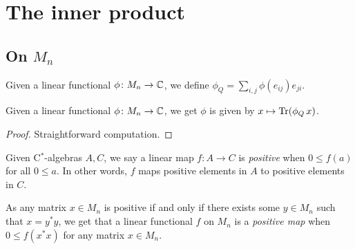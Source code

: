 \chapter{The inner product}

 \section{On $M_n$}

  \begin{definition}\label{Dual.matrix}\leanok
   Given a linear functional $\phi\colon M_n \to \mathbb{C}$, we define $\phi_Q=\sum_{i,j}\phi(e_{ij})e_{ji}$.
  \end{definition}

  \begin{lemma}\label{dual_eq_trace}\leanok
   Given a linear functional $\phi\colon M_n\to\mathbb{C}$, we get $\phi$ is given by $x\mapsto\operatorname{Tr}(\phi_Q \,x)$.
  \end{lemma}
  \begin{proof}\leanok
   Straightforward computation.
  \end{proof}

  \begin{definition}\label{LinearMap.IsPosMap}\leanok
   Given C$^*$-algebras $A,C$, we say a linear map $f\colon A \to C$ is \textit{positive} when $0\leq f(a)$ for all $0\leq a$. In other words, $f$ maps positive elements in $A$ to positive elements in $C$.
  \end{definition}

  As any matrix $x\in{M_n}$ is positive if and only if there exists some $y\in M_n$ such that $x=y^*y$, we get that a linear functional $f$ on $M_n$ is a \textit{positive map} when $0\leq{f(x^*x)}$ for any matrix $x\in{M_n}$.

